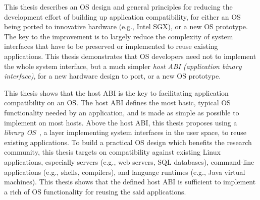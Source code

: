 This thesis describes an OS design and general principles for reducing the development effort of building up application compatibility, 
for either an OS being ported to innovative hardware (e.g., Intel SGX),
or a new OS prototype.
The key to the improvement
is to largely reduce the complexity of system interfaces that have to be preserved or implemented to reuse existing applications.
This thesis demonstrates that OS developers need not to implement the whole system interface,
but a much simpler {\em host ABI (application binary interface)},
for a new hardware design to port, or a new OS prototype.




This thesis shows that
the host ABI is the key to facilitating application compatibility on an OS.
The host ABI defines the most basic, typical OS functionality needed by an application,
and is made as simple as possible to implement on most hosts.
Above the host ABI, this thesis proposes using a {\em library OS}~\cite{porter11drawbridge,engler95exokernel,libra,unikernels},
a layer implementing system interfaces in the user space, to reuse existing applications.
To build a practical OS design which benefits the research community,
this thesis targets on compatibility against existing Linux applications, especially servers (e.g., web servers, SQL databases), command-line applications (e.g., shells, compilers), and language runtimes (e.g., Java virtual machines).
This thesis shows that the defined host ABI is sufficient to implement a rich of OS functionality for reusing the said applications.


